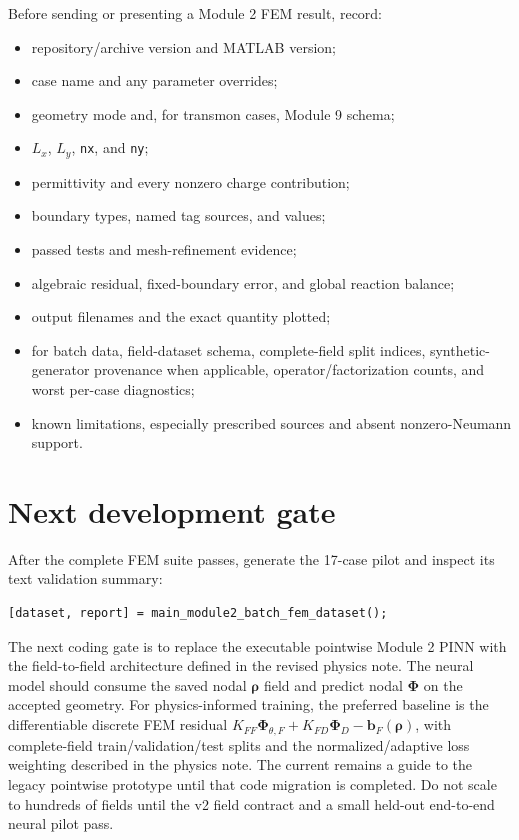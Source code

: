 \documentclass[11pt]{article}
\newcommand{\matlabfile}[1]{\path{#1}}
\begin{document}
Before sending or presenting a Module 2 FEM result, record:
\begin{itemize}[leftmargin=*]
  \item repository/archive version and MATLAB version;
  \item case name and any parameter overrides;
  \item geometry mode and, for transmon cases, Module 9 schema;
  \item $L_x$, $L_y$, \texttt{nx}, and \texttt{ny};
  \item permittivity and every nonzero charge contribution;
  \item boundary types, named tag sources, and values;
  \item passed tests and mesh-refinement evidence;
  \item algebraic residual, fixed-boundary error, and global reaction balance;
  \item output filenames and the exact quantity plotted;
  \item for batch data, field-dataset schema, complete-field split indices, synthetic-generator provenance when applicable, operator/factorization counts, and worst per-case diagnostics;
  \item known limitations, especially prescribed sources and absent nonzero-Neumann support.
\end{itemize}

\section{Next development gate}

After the complete FEM suite passes, generate the 17-case pilot and inspect its text validation summary:
\begin{lstlisting}[style=projectmatlab]
[dataset, report] = main_module2_batch_fem_dataset();
\end{lstlisting}
The next coding gate is to replace the executable pointwise Module 2 PINN with the field-to-field architecture defined in the revised physics note. The neural model should consume the saved nodal $\bm{\rho}$ field and predict nodal $\bm{\Phi}$ on the accepted geometry. For physics-informed training, the preferred baseline is the differentiable discrete FEM residual $K_{FF}\bm{\Phi}_{\theta,F}+K_{FD}\bm{\Phi}_D-\bm{b}_F(\bm{\rho})$, with complete-field train/validation/test splits and the normalized/adaptive loss weighting described in the physics note. The current \matlabfile{module2_pinn_implementation_note.pdf} remains a guide to the legacy pointwise prototype until that code migration is completed. Do not scale to hundreds of fields until the v2 field contract and a small held-out end-to-end neural pilot pass.
\end{document}

